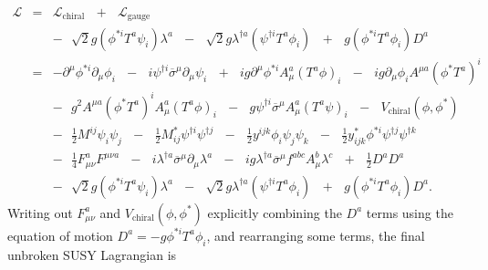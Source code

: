 \documentclass[dissertation.tex]{subfiles}
\begin{document}
\begin{eqnarray}
\label{eq:L_full}
\mathcal{L} &=& \mathcal{L}_{\mathrm{chiral}}\mbox{ }+\mbox{ }\mathcal{L}_{\mathrm{gauge}}\mbox{ }\nonumber \\
&&-\mbox{ }\sqrt{2}g(\phi^{*i}T^{a}\psi_{i})\lambda^{a}\mbox{ }-\mbox{ }\sqrt{2}g\lambda^{\dag a}(\psi^{\dag i}T^{a}\phi_{i})\mbox{ }+\mbox{ }g(\phi^{*i}T^{a}\phi_{i})D^{a}\nonumber \\
&=&-\partial^{\mu}\phi^{*i}\partial_{\mu}\phi_{i}\mbox{ }-\mbox{ }i\psi^{\dag i}\overline{\sigma}^{\mu}\partial_{\mu}\psi_{i}\mbox{ }+\mbox{ }ig\partial^{\mu}\phi^{*i}A_{\mu}^{a}(T^{a}\phi)_{i}\mbox{ }-\mbox{ }ig\partial_{\mu}\phi_{i}A^{\mu a}(\phi^{*}T^{a})^{i}\mbox{ }\nonumber \\
&&-\mbox{ }g^{2}A^{\mu a}(\phi^{*}T^{a})^{i}A_{\mu}^{a}(T^{a}\phi)_{i}\mbox{ }-\mbox{ }g\psi^{\dag i}\overline{\sigma}^{\mu}A_{\mu}^{a}(T^{a}\psi)_{i}\mbox{ }-\mbox{ }V_{\mathrm{chiral}}(\phi, \phi^{*})\mbox{ }\nonumber \\
&&-\mbox{ }\frac{1}{2}M^{ij}\psi_{i}\psi_{j}\mbox{ }-\mbox{ }\frac{1}{2}M_{ij}^{*}\psi^{\dag i}\psi^{\dag j}\mbox{ }-\mbox{ }\frac{1}{2}y^{ijk}\phi_{i}\psi_{j}\psi_{k}\mbox{ }-\mbox{ }\frac{1}{2}y_{ijk}^{*}\phi^{*i}\psi^{\dag j}\psi^{\dag k}\mbox{ }\nonumber \\
&&-\mbox{ }\frac{1}{4}F_{\mu\nu}^{a}F^{\mu\nu a}\mbox{ }-\mbox{ }i\lambda^{\dag a}\overline{\sigma}^{\mu}\partial_{\mu}\lambda^{a}\mbox{ }-\mbox{ }ig\lambda^{\dag a}\overline{\sigma}^{\mu}f^{abc}A_{\mu}^{b}\lambda^{c}\mbox{ }+\mbox{ }\frac{1}{2}D^{a}D^{a}\mbox{ }\nonumber \\
&&-\mbox{ }\sqrt{2}g(\phi^{*i}T^{a}\psi_{i})\lambda^{a}\mbox{ }-\mbox{ }\sqrt{2}g\lambda^{\dag a}(\psi^{\dag i}T^{a}\phi_{i})\mbox{ }+\mbox{ }g(\phi^{*i}T^{a}\phi_{i})D^{a}.
\end{eqnarray}
%
Writing out $F_{\mu\nu}^{a}$ and $V_{\mathrm{chiral}}(\phi, \phi^{*})$ explicitly combining the $D^{a}$ terms using the equation of motion $D^{a} = -g\phi^{*i}T^{a}\phi_{i}$, and rearranging some terms, the final unbroken SUSY Lagrangian is
\end{document}
